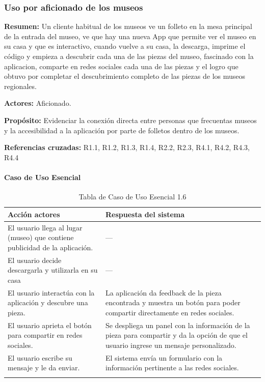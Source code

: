 \subsubsection{Uso por aficionado de los museos}

{\textbf {Resumen:}}
Un cliente habitual de los museos ve un folleto en la mesa principal de la entrada del museo, ve que hay una nueva App que permite ver el museo en su casa y que es interactivo, cuando vuelve a su casa, la descarga, imprime el código y empieza a descubrir cada una de las piezas del museo, fascinado con la aplicacion, comparte en redes sociales cada una de las piezas y el logro que obtuvo por completar el descubrimiento completo de las piezas de los museos regionales.

{\textbf {Actores:}}
Aficionado.

{\textbf {Propósito:}}
Evidenciar la conexión directa entre personas que frecuentas museos y la accesibilidad a la aplicación por parte de folletos dentro de los museos.

{\textbf {Referencias cruzadas:}}
R1.1, R1.2, R1.3, R1.4, R2.2, R2.3, R4.1, R4.2, R4.3, R4.4

\paragraph{Caso de Uso Esencial}

\begin{longtable}{|p{5cm}|p{8cm}|}
\hline 
Acción actores & Respuesta del sistema \\ 
\hline 
El usuario llega al lugar (museo) que contiene publicidad de la aplicación. & --- \\ 
\hline 
El usuario decide descargarla y utilizarla en su casa & --- \\ 
\hline
El usuario interactúa con la aplicación y descubre una pieza. & La aplicación da feedback de la pieza encontrada y muestra un botón para poder compartir directamente en redes sociales. \\ 
\hline
El usuario aprieta el botón para compartir en redes sociales. & Se despliega un panel con la información de la pieza para compartir y da la opción de que el usuario ingrese un mensaje personalizado. \\ 
\hline
El usuario escribe su mensaje y le da enviar. & El sistema  envía un formulario con la información pertinente a las redes sociales. \\ 
\hline
\caption{Tabla de Caso de Uso Esencial 1.6}
\label{tab26}
\end{longtable}

